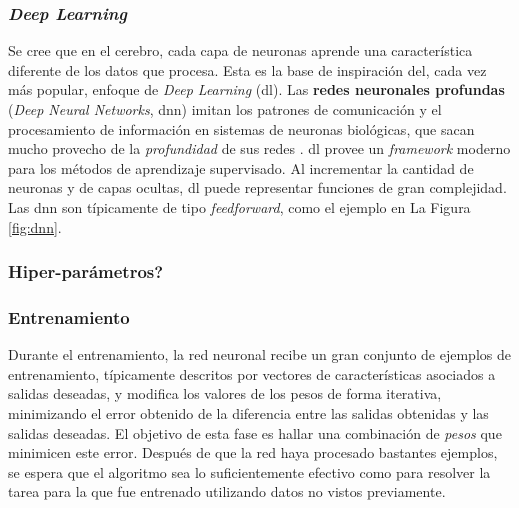 \subsubsection{\emph{Deep Learning}}

Se cree que en el cerebro, cada capa de neuronas aprende una característica diferente de los datos que procesa. Esta es la base de inspiración del, cada vez más popular, enfoque de \emph{Deep Learning} (\acrshort{dl}). Las \textbf{redes neuronales profundas} (\emph{Deep Neural Networks}, \acrshort{dnn}) imitan los patrones de comunicación y el procesamiento de información en sistemas de neuronas biológicas, que sacan mucho provecho de la \textit{profundidad} de sus redes \cite{Aggarwal}.
%
\acrshort{dl} provee un \emph{framework} moderno para los métodos de aprendizaje supervisado. Al incrementar la cantidad de neuronas y de capas ocultas, \acrshort{dl} puede representar funciones de gran complejidad. Las \acrshort{dnn} son típicamente de tipo \emph{feedforward}, como el ejemplo en La Figura \ref{fig:dnn}.



\subsubsection{Hiper-parámetros?}


\subsubsection{Entrenamiento}

Durante el entrenamiento, la red neuronal recibe un gran conjunto de ejemplos de entrenamiento, típicamente descritos por vectores de características asociados a salidas deseadas, y modifica los valores de los pesos de forma iterativa, minimizando el error obtenido de la diferencia entre las salidas obtenidas y las salidas deseadas. El objetivo de esta fase es hallar una combinación de \textit{pesos} que minimicen este error. Después de que la red haya procesado bastantes ejemplos, se espera que el algoritmo sea lo suficientemente efectivo como para resolver la tarea para la que fue entrenado \cite{Buduma} utilizando datos no vistos previamente.
%

